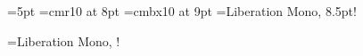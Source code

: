
\def\monofont{\dofont Liberation Mono}

\fontsize=6pt
\serifsize=7pt
\scriptsize=5pt
\scriptscriptsize=3.5pt
\font\headlinefont=cmr10 at 8pt
\font\headerfont=cmbx10 at 9pt
\font\ttheaderfont=\monofont, 8.5pt!
\def\monofam{%
	\font\tenrm=\monofont, \fontsize!%
	\font\tenbf=\monofont/B, \fontsize!%
	\font\tenit=\monofont/I, \fontsize!%
}
\def\seriffam{%
	\font\tenrm=cmr10 at \serifsize\font\sevenrm=cmr7 at \scriptsize\font\fiverm=cmr5 at\scriptscriptsize
	\font\tenbf=cmbx10 at \serifsize
	\font\tenit=cmti10 at \serifsize
	\font\teni=cmmi10 at \serifsize\font\seveni=cmmi7 at \scriptsize\font\fivei=cmmi5 at\scriptscriptsize
	\font\tensy=cmsy10 at \serifsize\font\sevensy=cmsy7 at \scriptsize\font\fivesy=cmsy5 at\scriptscriptsize
	\font\tenex=cmex10 at \serifsize\font\sevenex=cmex7 at \scriptsize\font\fiveex=cmex5 at\scriptscriptsize
	\baselineskip=8.5pt%
}

\font\tentt=\monofont, \fontsize!%
\def\tt{\tentt}

\def\typ{\col{0 0 .5}\bf}   %
\def\com{\col{.3 .3 .3}\it} %
\def\str{\col{0 .7 0}\rm}   %
\def\dir{\col{.5 0 0}\it}   %
\def\key{\col{0 0 0}\bf}    %
\def\con{\col{.8 .1 .2}\rm} %
\def\tem{\col{.0 .2 .8}\bf} %
\def\hcol{\col{.0 .0 .0}\rm}   %

\def\docname{Charles University in Prague -- T\v ri nerdi}
